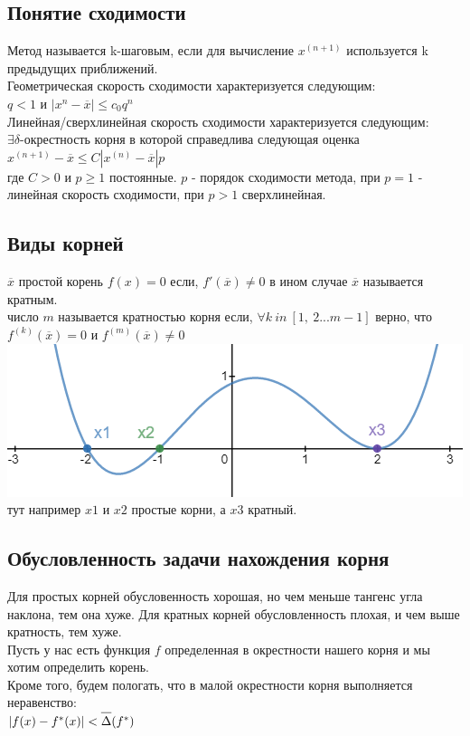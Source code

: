 \documentclass[16pt]{article}
\begin{document}
			\subsection{Понятие сходимости}
			Метод называется k-шаговым, если для вычисление $x^{(n+1)}$ используется k предыдущих приближений.\\
			Геометрическая скорость сходимости характеризуется следующим:\\
			$q < 1$ и $|x^{n} - \overline{x}| \leq c_0 q^n$\\
			Линейная/сверхлинейная скорость сходимости характеризуется следующим:\\
			$\exists \delta$-окрестность корня в которой справедлива следующая оценка\\
			$x^{(n+1)}-\overline{x} \leq C|x^{(n)}-\overline{x}|p$\\
			где $C>0$ и $p \geq 1$ постоянные. $p$ - порядок сходимости метода, при $p=1$ - линейная скорость сходимости, при $p>1$ сверхлинейная. 
			\subsection{Виды корней}
			$\overline{x}$ простой корень $f(x)=0$ если, $f'(\overline{x})\neq0$ в ином случае $\overline{x}$ называется кратным.\\
			число $m$ называется кратностью корня если, $\forall k\ in\ [1,\ 2...m-1]$ верно, что $f^{(k)}(\overline{x})=0$ и $f^{(m)}(\overline{x})\neq 0$\\ 
			\includegraphics{roots.png}\\
			тут например $x1$ и $x2$ простые корни, а $x3$ кратный.
			\subsection{Обусловленность задачи нахождения корня}
			Для простых корней обусловенность хорошая, но чем меньше тангенс угла наклона, тем она хуже. Для кратных корней обусловленность плохая, и чем выше кратность, тем хуже.\\
			Пусть у нас есть функция $f$ определенная в окрестности нашего корня и мы хотим определить корень.\\
			Кроме того, будем пологать, что в малой окрестности корня выполняется неравенство:\\
			$|f(x)-f^{*}(x)|<\overline{\raisebox{3mm}{}\Delta}(f^{*})$\\
\end{document}
